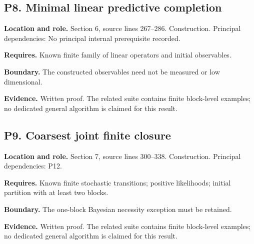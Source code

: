 \documentclass[11pt,letterpaper]{article}
\begin{document}
\par\noindent\begin{minipage}{\textwidth}
\subsection{P8. Minimal linear predictive
completion}\label{p8.-minimal-linear-predictive-completion}

\textbf{Location and role.} Section 6, source lines 267--286.
Construction. Principal dependencies: No principal internal prerequisite
recorded.

\textbf{Requires.} Known finite family of linear operators and initial
observables.

\textbf{Boundary.} The constructed observables need not be measured or
low dimensional.

\textbf{Evidence.} Written proof. The related suite contains finite
block-level examples; no dedicated general algorithm is claimed for this
result.
\end{minipage}\par\medskip

\par\noindent\begin{minipage}{\textwidth}
\subsection{P9. Coarsest joint finite
closure}\label{p9.-coarsest-joint-finite-closure}

\textbf{Location and role.} Section 7, source lines 300--338.
Construction. Principal dependencies: P12.

\textbf{Requires.} Known finite stochastic transitions; positive
likelihoods; initial partition with at least two blocks.

\textbf{Boundary.} The one-block Bayesian necessity exception must be
retained.

\textbf{Evidence.} Written proof. The related suite contains finite
block-level examples; no dedicated general algorithm is claimed for this
result.
\end{minipage}\par\medskip
\end{document}
